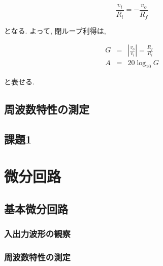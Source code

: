 \documentclass[titlepage]{jsarticle}
\begin{document}
    \begin{equation}
        \frac{v_i}{R_i} = -\frac{v_o}{R_f}
    \end{equation}

    となる. よって, 閉ループ利得は,

    \begin{eqnarray}
        G &=& \left|\frac{v_o}{v_i}\right| = \frac{R_f}{R_i} \\
        A &=& 20 \log_{10}G
    \end{eqnarray}

    と表せる.

    \subsection{周波数特性の測定}

    \subsection{課題1}
        \paragraph{}

        \paragraph{}

        \paragraph{}

\section{微分回路}
    
    \subsection{基本微分回路}

        \subsubsection{入出力波形の観察}

        \subsubsection{周波数特性の測定}
\end{document}
